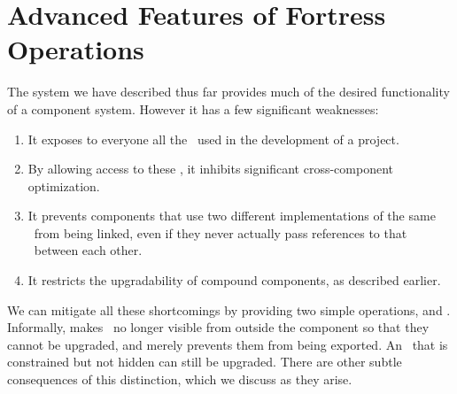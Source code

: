 %
%
%
%

 \section{Advanced Features of Fortress Operations}

The system we have described thus far
provides much of the desired functionality of a component system.
However it has a few significant weaknesses:
\begin{enumerate}

\item
It exposes to everyone all the \apisN\ used
in the development of a project.

\item
By allowing access to these \apisN,
it inhibits significant cross-component optimization.

\item
It prevents components that use two different implementations of the same
\apiN\ from being linked,
even if they never actually pass references to that \apiN\
between each other.

\item
It restricts the upgradability of compound components,
as described earlier.

\end{enumerate}

We can mitigate all these shortcomings
by providing two simple operations,
 and .
Informally,
 makes \apisN\ no longer visible from outside the component
so that they cannot be upgraded,
and  merely prevents them from being exported.
An \apiN\ that is constrained but not hidden
can still be upgraded.
There are other subtle consequences of this distinction,
which we discuss as they arise.

